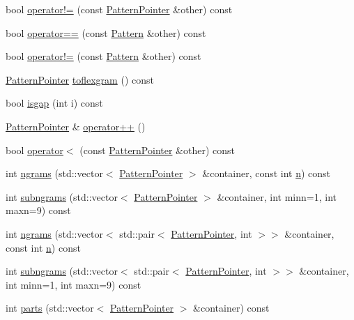 \begin{DoxyCompactItemize}
\item 
bool \hyperlink{classPatternPointer_acdb6d4e30680813986d6e6d2cc4c49c3}{operator!=} (const \hyperlink{classPatternPointer}{Pattern\+Pointer} \&other) const 
\item 
bool \hyperlink{classPatternPointer_a811a89fbc68a8dfba2202cc10e2b18c7}{operator==} (const \hyperlink{classPattern}{Pattern} \&other) const 
\item 
bool \hyperlink{classPatternPointer_aa741dfe682c3ef299f1dbebac5ba5686}{operator!=} (const \hyperlink{classPattern}{Pattern} \&other) const 
\item 
\hyperlink{classPatternPointer}{Pattern\+Pointer} \hyperlink{classPatternPointer_a6debba7dd934678060a88db6daa8845a}{toflexgram} () const 
\item 
bool \hyperlink{classPatternPointer_a937e665a5d2a649ed7281ad878016e5a}{isgap} (int i) const 
\item 
\hyperlink{classPatternPointer}{Pattern\+Pointer} \& \hyperlink{classPatternPointer_a7811fb9f118192d3518a45f3ecc55bef}{operator++} ()
\item 
bool \hyperlink{classPatternPointer_ab526b8218a98671dd25cb49121d951eb}{operator$<$} (const \hyperlink{classPatternPointer}{Pattern\+Pointer} \&other) const 
\item 
int \hyperlink{classPatternPointer_aafda149990a0f254f2c24d121796df55}{ngrams} (std\+::vector$<$ \hyperlink{classPatternPointer}{Pattern\+Pointer} $>$ \&container, const int \hyperlink{classPatternPointer_a557d9f27ecad057a8942770313c22e42}{n}) const 
\item 
int \hyperlink{classPatternPointer_a86f864d3b5d9504f8aa29836a4c57049}{subngrams} (std\+::vector$<$ \hyperlink{classPatternPointer}{Pattern\+Pointer} $>$ \&container, int minn=1, int maxn=9) const 
\item 
int \hyperlink{classPatternPointer_a68524816c4b4504aa950a6000d5fbd15}{ngrams} (std\+::vector$<$ std\+::pair$<$ \hyperlink{classPatternPointer}{Pattern\+Pointer}, int $>$$>$ \&container, const int \hyperlink{classPatternPointer_a557d9f27ecad057a8942770313c22e42}{n}) const 
\item 
int \hyperlink{classPatternPointer_a9313e5d4ec8575aab14f04922011ed71}{subngrams} (std\+::vector$<$ std\+::pair$<$ \hyperlink{classPatternPointer}{Pattern\+Pointer}, int $>$$>$ \&container, int minn=1, int maxn=9) const 
\item 
int \hyperlink{classPatternPointer_a00cdaf2a3844e6ea12bc2c51bd37e77d}{parts} (std\+::vector$<$ \hyperlink{classPatternPointer}{Pattern\+Pointer} $>$ \&container) const 

\end{DoxyCompactItemize}

